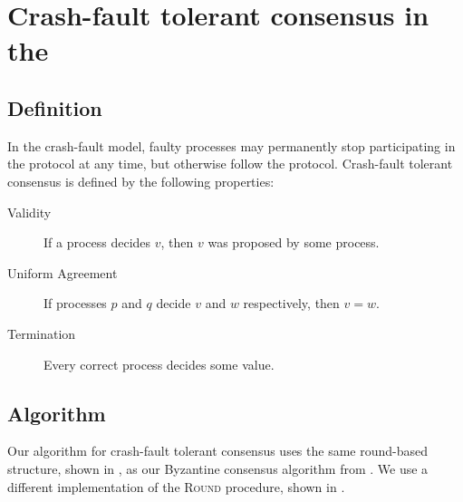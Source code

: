 \section{Crash-fault tolerant consensus in the \model}\label{sec:crash-fault}

\subsection{Definition}
In the crash-fault model, faulty processes may permanently stop participating in the protocol at any time, but otherwise follow the protocol.
Crash-fault tolerant consensus is defined by the following properties:
\begin{description}
    \item[Validity] If a process decides $v$, then $v$ was proposed by some process. 
    \item[Uniform Agreement] If processes $p$ and $q$ decide $v$ and $w$ respectively, then $v = w$.
    \item[Termination] Every correct process decides some value.
\end{description}

\subsection{Algorithm}

Our algorithm for crash-fault tolerant consensus uses the same round-based structure, shown in , as our Byzantine consensus algorithm from . We use a different implementation of the \textsc{Round} procedure, shown in .

